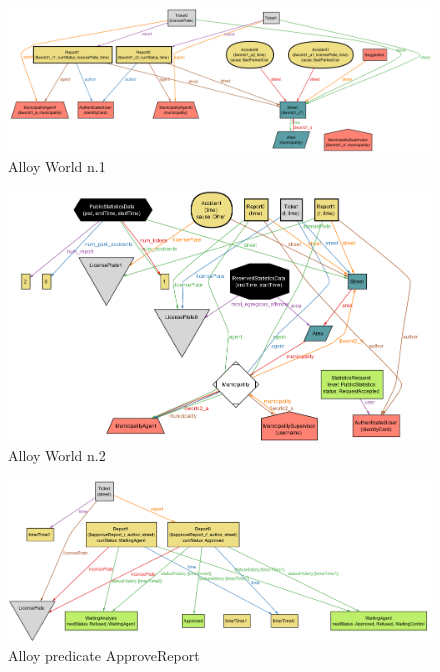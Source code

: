 \documentclass[a4paper]{report}
\begin{document}
\begin{landscape}

\begin{figure}[hp]
\includegraphics[angle=0, scale=0.55]{world1}
\caption{Alloy World n.1}
\label{fig:world1}
\end{figure}
\end{landscape}

\begin{landscape}
\begin{figure}[hp]
\includegraphics[angle=0, scale = 0.7]{world2-2}
\caption{Alloy World n.2}
\label{fig:world2}
\end{figure}
\end{landscape}

\begin{landscape}
\begin{figure}[hp]
\includegraphics[angle=0, scale=0.6]{reportApprovation}
\caption{Alloy predicate ApproveReport}
\label{fig:approveReport}
\end{figure}
\end{landscape}
\end{document}
